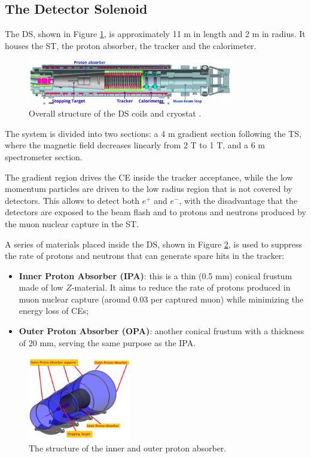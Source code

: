 \subsection{The Detector Solenoid}\label{detectorsolenoid}
The DS, shown in Figure \ref{fig:DS}, is approximately 11 m in 
length and 2 m in radius. It houses the ST, 
the proton absorber, the tracker and the calorimeter. 
\begin{figure}[!h]
    \centering
    \includegraphics[width =0.8\textwidth]{figures/png/Screenshot_20240306_225639.png}
    \caption[The structure of the Detector Solenoid coils and cryostat.]{Overall structure of the DS coils and cryostat \cite{bobbb}.}
    \label{fig:DS}
    \end{figure}
The system is divided into two sections: a 4 
m gradient section following the TS, 
where the magnetic field decreases linearly from 2 T to 1 T, and a 6 
m spectrometer section. 

The gradient region drives the CE 
inside the tracker acceptance, while the low momentum particles 
are driven to the low radius region that is not covered by detectors.  
This allows to detect both $e^+$ and $e^-$, with the disadvantage that the detectors are exposed to the 
beam flash and to protons and neutrons produced by the muon
nuclear capture in the ST.

A series of materials placed inside the DS, shown in 
Figure \ref{fig:absorbersDS}, is used to suppress 
the rate of protons and neutrons that can generate spare hits in the 
tracker:
\begin{itemize}
    \item \textbf{Inner Proton Absorber (IPA)}: this is a thin (0.5 mm) conical 
    frustum made of low $Z$-material. It aims to reduce the rate of protons produced 
    in muon nuclear capture (around 0.03 per captured muon) while minimizing the 
    energy loss of CEs;
    \item \textbf{Outer Proton Absorber (OPA)}: another conical frustum with a 
    thickness of 20 mm, serving the same purpose as the IPA.
\end{itemize}
\begin{figure}[!h]
    \centering
    \includegraphics[width =0.4\textwidth]{figures/png/Screenshot_20240706_132949.png}
    \caption[The structure of the inner and outer proton absorber.]{The structure of the inner and outer proton absorber.}
    \label{fig:absorbersDS}
    \end{figure}




